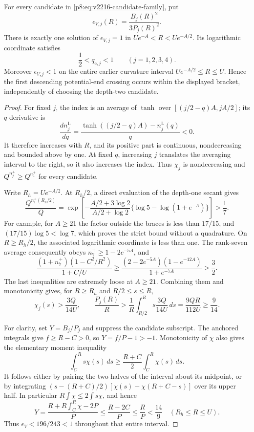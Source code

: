 \documentclass[12pt,a4paper]{article}
\begin{document}
\begin{theorem}
\label{p8:thm:v2216-all-candidate-potential-end}
For every candidate in \eqref{p8:eq:v2216-candidate-family}, put
\[
 \epsilon_{V,j}(R)=\frac{B_j(R)^2}{3P_j(R)^2}.
\]
There is exactly one solution of \(\epsilon_{V,j}=1\) in
\(Ue^{-A}<R<Ue^{-A/2}\).  Its logarithmic coordinate satisfies
\[
 \boxed{\frac12<q_{\mathrm e,j}<1
                    \qquad(j=1,2,3,4).}
\]
Moreover \(\epsilon_{V,j}<1\) on the entire earlier curvature
interval \(Ue^{-A/2}\le R\le U\).  Hence the first descending
potential-end crossing occurs within the displayed bracket, independently
of choosing the depth-two candidate.
\end{theorem}
\begin{proof}
For fixed \(j\), the index is an average of \(\tanh\) over
\([(j/2-q)A,jA/2]\); its \(q\) derivative is
\[
 \frac{d n_j^{\mathrm L}}{dq}
       =\frac{\tanh((j/2-q)A)-n_j^{\mathrm L}(q)}q<0.
\]
It therefore increases with \(R\), and its positive part is continuous,
nondecreasing and bounded above by one.  At fixed \(q\), increasing
\(j\) translates the averaging interval to the right, so it also
increases the index.  Thus \(\chi_j\) is nondecreasing and
\(Q^{n_j^+}\ge Q^{n_1^+}\) for every candidate.

Write \(R_h=Ue^{-A/2}\).  At \(R_h/2\), a direct evaluation of the
depth-one secant gives
\[
 \frac{Q^{n_1^+(R_h/2)}}Q
 =\exp\left[-\frac{A/2+3\log2}{A/2+\log2}
          \{\log5-\log(1+e^{-A})\}\right]>\frac17.
\]
For example, for \(A\ge21\) the factor outside the braces is less
than \(17/15\), and
\((17/15)\log5<\log7\), which proves the strict bound without a
quadrature.  On \(R\ge R_h/2\), the associated logarithmic coordinate
is less than one.  The rank-seven average consequently obeys
\(n_7^+\ge1-2e^{-5A}\), and
\[
 \frac{(1+n_7^+)(1-C^2/R^2)}{1+C/U}
 \ge\frac{(2-2e^{-5A})(1-e^{-12A})}{1+e^{-7A}}>\frac32.
\]
The last inequalities are extremely loose at \(A\ge21\).  Combining
them and monotonicity gives, for \(R\ge R_h\) and
\(R/2\le s\le R\),
\[
 \chi_j(s)>\frac{3Q}{14U},\qquad
 \frac{P_j(R)}R>
 \frac1R\int_{R/2}^R s\frac{3Q}{14U}\,ds
       =\frac{9QR}{112U}\ge\frac9{14}.
\]

For clarity, set \(Y=B_j/P_j\) and suppress the candidate subscript.
The anchored integrals give \(f\ge R-C>0\), so
\(Y=f/P-1>-1\).  Monotonicity of \(\chi\) also gives the elementary
moment inequality
\[
 \int_C^R s\chi(s)\,ds\ge\frac{R+C}{2}
                                      \int_C^R\chi(s)\,ds.
\]
It follows either by pairing the two halves of the interval about its
midpoint, or by integrating
\((s-(R+C)/2)[\chi(s)-\chi(R+C-s)]\) over its upper half.
In particular \(R\int\chi\le2\int s\chi\), and hence
\[
 Y=\frac{R+R\int_C^R\chi-2P}{P}
     \le\frac{R-2C}{P}\le\frac RP<\frac{14}{9}
                   \quad(R_h\le R\le U).
\]
Thus \(\epsilon_V<196/243<1\) throughout that entire interval.


\end{proof}
\end{document}
